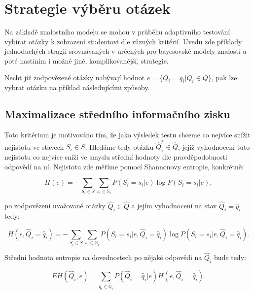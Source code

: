 \documentclass[a4paper,twoside,12pt]{book}
\begin{document}

\chapter{Strategie výběru otázek}
\label{chap:question_selection}
Na základě znalostního modelu se mohou v průběhu adaptivního testování vybírat otázky k zobrazení studentovi dle různých kritérií. Uvedu zde příklady jednoduchých  stragií srovnávaných v \cite{question_selection} určených pro bayesovské modely znalostí a poté nastíním i možné jiné, komplikovanější, strategie.

Nechť již zodpovězené otázky nabývají hodnot $e=\{Q_i=q_i|Q_i\in\overline{Q}\}$, pak lze vybrat otázku na příklad následujícími způsoby.

\section{Maximalizace středního informačního zisku}
Toto kritérium je motivováno tím, že jako výsledek testu chceme co nejvíce snížit nejistotu ve stavech $S_i \in S$. Hledáme tedy otázku $\widehat{Q}^*_i \in \widehat{Q}$, jejíž vyhodnocení tuto nejistotu co nejvíce sníží ve smyslu střední hodnoty dle pravděpodobnosti odpovědí na ní. Nejistotu zde měříme pomocí Shannonovy entropie, konkrétně:

\begin{equation}
	H(e) = -\sum_{S_i \in S}\sum_{s_i \in \mathbb{S}_i}P(S_i=s_i|e) \log{}P(S_i=s_i|e),
\end{equation}

po zodpovězení uvažované otázky $\widehat{Q}_i \in \widehat{Q}$ a jejím vyhodnocení na stav $\widehat{Q}_i = \widehat{q}_i$ tedy:

\begin{equation}
	H(e, \widehat{Q}_i = \widehat{q}_i) = -\sum_{S_i \in S}\sum_{s_i \in \mathbb{S}_i}P(S_i=s_i|e, \widehat{Q}_i = \widehat{q}_i) \log{}P(S_i=s_i|e, \widehat{Q}_i = \widehat{q}_i).
\end{equation}

Střední hodnota entropie na dovednostech po nějaké odpovědi na $\widehat{Q}_i$ bude tedy:

\begin{equation}
	EH(\widehat{Q}_i,e) = \sum_{\widehat{q}_i \in \widehat{\mathbb{Q}}_i}P(\widehat{Q}_i = \widehat{q}_i|e) H(e, \widehat{Q}_i = \widehat{q}_i).
\end{equation}
\end{document}
